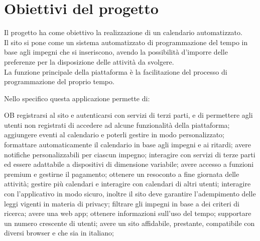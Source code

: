 \section{Obiettivi del progetto}
\label{sec:ObiettiviProgetto}
Il progetto ha come obiettivo la realizzazione di un calendario automatizzato.\\
Il sito si pone come un sistema automatizzato di programmazione del tempo in base agli impegni che si inseriscono, avendo la possibilità d'imporre delle preferenze per la disposizione delle attività da svolgere.\\
La funzione principale della piattaforma è la facilitazione del processo di programmazione del proprio tempo.

\vspace{0.5cm}

Nello specifico questa applicazione permette di:
\begin{listaPersonale}{OB}
       registrarsi al sito e autenticarsi con servizi di terzi parti, e di permettere agli utenti non registrati di accedere ad alcune funzionalità della piattaforma;
       aggiungere eventi al calendario e poterli gestire in modo personalizzato;
       formattare automaticamente il calendario in base agli impegni e ai ritardi;
       avere notifiche personalizzabili per ciascun impegno;
       interagire con servizi di terze parti ed essere adattabile a dispositivi di dimensione variabile;
       avere accesso a funzioni premium e gestirne il pagamento;
       ottenere un resoconto a fine giornata delle attività;
       gestire più calendari e interagire con calendari di altri utenti;
       interagire con l'applicativo in modo sicuro, inoltre il sito deve garantire l'adempimento delle leggi vigenti in materia di privacy;
       filtrare gli impegni in base a dei criteri di ricerca;
       avere una web app;
       ottenere informazioni sull'uso del tempo;
       supportare un numero crescente di utenti;
       avere un sito affidabile, prestante, compatibile con diversi browser e che sia in italiano;
\end{listaPersonale}
